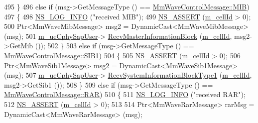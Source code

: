 \begin{DoxyCode}
495                 \}
496                 \textcolor{keywordflow}{else} \textcolor{keywordflow}{if} (msg->GetMessageType () == \hyperlink{classns3_1_1MmWaveControlMessage_afd7af53dea4ef8b652cf206acd508869a4826df1ed8d6aaefe44d8ddde816d6ea}{MmWaveControlMessage::MIB})
497                 \{
498                         \hyperlink{group__logging_gafbd73ee2cf9f26b319f49086d8e860fb}{NS\_LOG\_INFO} (\textcolor{stringliteral}{"received MIB"});
499                         \hyperlink{assert_8h_a6dccdb0de9b252f60088ce281c49d052}{NS\_ASSERT} (\hyperlink{classns3_1_1MmWavePhy_a0594531da45f93220d4f5de292bae823}{m\_cellId} > 0);
500                         Ptr<MmWaveMibMessage> msg2 = DynamicCast<MmWaveMibMessage> (msg);
501                         \hyperlink{classns3_1_1MmWaveUePhy_a32f5b517417dafeb41ec4cd7d24069f1}{m\_ueCphySapUser}->
      \hyperlink{classns3_1_1LteUeCphySapUser_a6b48cc819f095ed29a7580f94f6765ec}{RecvMasterInformationBlock} (\hyperlink{classns3_1_1MmWavePhy_a0594531da45f93220d4f5de292bae823}{m\_cellId}, msg2->GetMib ());
502                 \}
503                 \textcolor{keywordflow}{else} \textcolor{keywordflow}{if} (msg->GetMessageType () == \hyperlink{classns3_1_1MmWaveControlMessage_afd7af53dea4ef8b652cf206acd508869abfe62627190d14786158aab72b88fdb2}{MmWaveControlMessage::SIB1})
504                 \{
505                         \hyperlink{assert_8h_a6dccdb0de9b252f60088ce281c49d052}{NS\_ASSERT} (\hyperlink{classns3_1_1MmWavePhy_a0594531da45f93220d4f5de292bae823}{m\_cellId} > 0);
506                         Ptr<MmWaveSib1Message> msg2 = DynamicCast<MmWaveSib1Message> (msg);
507                         \hyperlink{classns3_1_1MmWaveUePhy_a32f5b517417dafeb41ec4cd7d24069f1}{m\_ueCphySapUser}->
      \hyperlink{classns3_1_1LteUeCphySapUser_aac4ef620b88531ba04617e024392a73e}{RecvSystemInformationBlockType1} (\hyperlink{classns3_1_1MmWavePhy_a0594531da45f93220d4f5de292bae823}{m\_cellId}, msg2->GetSib1 ());
508                 \}
509                 \textcolor{keywordflow}{else} \textcolor{keywordflow}{if} (msg->GetMessageType () == \hyperlink{classns3_1_1MmWaveControlMessage_afd7af53dea4ef8b652cf206acd508869ad95e9cf8fc7680fdaa34baa212b50f60}{MmWaveControlMessage::RAR})
510                 \{
511                         \hyperlink{group__logging_gafbd73ee2cf9f26b319f49086d8e860fb}{NS\_LOG\_INFO} (\textcolor{stringliteral}{"received RAR"});
512                         \hyperlink{assert_8h_a6dccdb0de9b252f60088ce281c49d052}{NS\_ASSERT} (\hyperlink{classns3_1_1MmWavePhy_a0594531da45f93220d4f5de292bae823}{m\_cellId} > 0);
513 
514                         Ptr<MmWaveRarMessage> rarMsg = DynamicCast<MmWaveRarMessage> (msg);

\end{DoxyCode}
